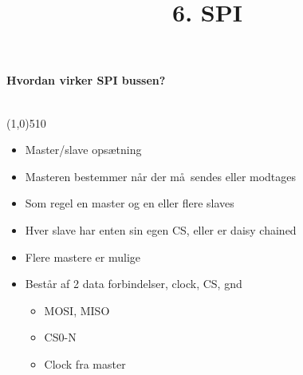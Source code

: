 \documentclass{paper}
\title{6. SPI}
\begin{document}
\maketitle
\begin{large}\textbf{Hvordan virker SPI bussen?}\end{large}\\
\line(1,0){510}
\begin{itemize}
	\item Master/slave ops\ae tning
	\item Masteren bestemmer n\aa r der m\aa\ sendes eller modtages
	\item Som regel en master og en eller flere slaves
	\item Hver slave har enten sin egen CS, eller er daisy chained
	\item Flere mastere er mulige
	\item Best\aa r af 2 data forbindelser, clock, CS, gnd
	\begin{itemize}
		\item MOSI, MISO
		\item CS0-N
		\item Clock fra master
	\end{itemize}
\end{itemize}
\end{document}
